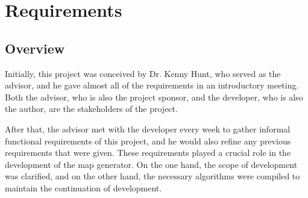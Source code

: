 \section{Requirements}
\label{sec:Requirements}

\subsection{Overview}
\label{sec:Requirements>Overview}
Initially, this project was conceived by Dr. Kenny Hunt, who served as the advisor, and he gave almost all of the requirements in an introductory meeting. Both the advisor, who is also the project sponsor, and the developer, who is also the author, are the stakeholders of the project.

After that, the advisor met with the developer every week to gather informal functional requirements of this project, and he would also refine any previous requirements that were given. These requirements played a crucial role in the development of the map generator. On the one hand, the scope of development was clarified, and on the other hand, the necessary algorithms were compiled to maintain the continuation of development.

